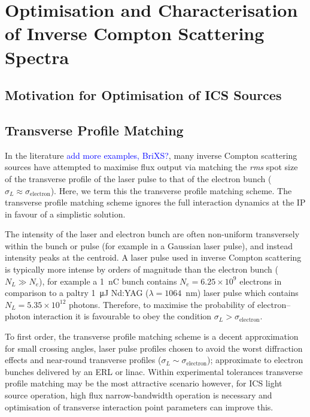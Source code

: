 \documentclass[../main.tex]{subfiles}
\begin{document}
\chapter{Optimisation and Characterisation of Inverse Compton Scattering Spectra}
\label{Optimisation_and_Characterisation_of_Inverse_Compton Scattering_Spectra} %

\section{Motivation for Optimisation of ICS Sources}

\section{Transverse Profile Matching}

In the literature \cite{akagi2016narrow,deitrick2018high,jacquet2015radiation} \textcolor{blue}{add more examples, BriXS?}, many inverse Compton scattering sources have attempted to maximise flux output via matching the \textit{rms} spot size of the transverse profile of the laser pulse to that of the electron bunch ($\sigma_{L}\approx\sigma_{\mathrm{electron}}$). Here, we term this the transverse profile matching scheme. The transverse profile matching scheme ignores the full interaction dynamics at the IP in favour of a simplistic solution. 

The intensity of the laser and electron bunch are often non-uniform transversely within the bunch or pulse (for example in a Gaussian laser pulse), and instead intensity peaks at the centroid. A laser pulse used in inverse Compton scattering is typically more intense by orders of magnitude than the electron bunch ($N_{L} \gg N_{e}$), for example a 1~\si{\nano\coulomb} bunch contains $N_{e} = 6.25\times 10^{9}$ electrons in comparison to a paltry 1~\si{\micro\joule} Nd:YAG ($\lambda = 1064$~\si{\nano\meter}) laser pulse which contains $N_{L} = 5.35\times 10^{12}$ photons. Therefore, to maximise the probability of electron--photon interaction it is favourable to obey the condition $\sigma_{L} > \sigma_{\mathrm{electron}}$.

To first order, the transverse profile matching scheme is a decent approximation for small crossing angles, laser pulse profiles chosen to avoid the worst diffraction effects and near-round transverse profiles ($\sigma_{L}\sim\sigma_{\mathrm{electron}}$); approximate to electron bunches delivered by an ERL or linac. Within experimental tolerances transverse profile matching may be the most attractive scenario however, for ICS light source operation, high flux narrow-bandwidth operation is necessary and optimisation of transverse interaction point parameters can improve this. 
\end{document}
